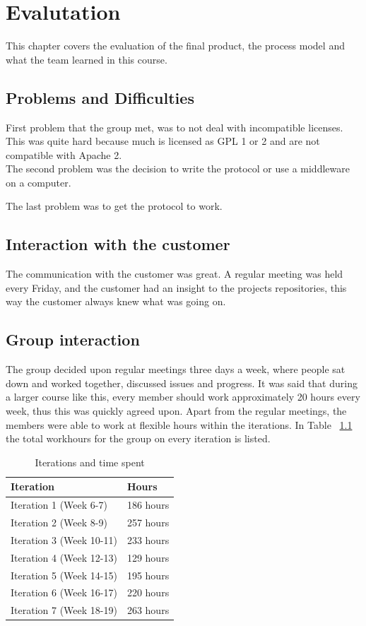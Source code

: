 \chapter{Evalutation}

This chapter covers the evaluation of the final product, the process model and what the team learned in this course.

\section{Problems and Difficulties}

	First problem that the group met, was to not deal with incompatible licenses. This was quite hard because much is licensed as GPL 1 or 2 and are not compatible with Apache 2. \\

	The second problem was the decision to write the protocol or use a middleware on a computer.

	The last problem was to get the protocol to work.

\section{Interaction with the customer}
	The communication with the customer was great. A regular meeting was held every Friday, and the customer had an insight to the projects repositories, this way the customer always knew what was going on. 


\section{Group interaction}
	The group decided upon regular meetings three days a week, where people sat down and worked together, discussed issues and progress. It was said that during a larger course like this, every member should work approximately 20 hours every week, thus this was quickly agreed upon. Apart from the regular meetings, the members were able to work at flexible hours within the iterations.
	In Table ~\ref{table:workhours} the total workhours for the group on every iteration is listed.

	\begin{table}[H]
	\caption{Iterations and time spent}
	\centering
	\label{table:workhours}
	\begin{tabular}{|l|l|}
		\hline
			{\bf Iteration} & {\bf Hours}\\
		\hline
			Iteration 1 (Week 6-7) & 186 hours\\
		\hline
			Iteration 2 (Week 8-9) & 257 hours\\
		\hline
			Iteration 3 (Week 10-11) & 233 hours\\
		\hline
			Iteration 4 (Week 12-13) & 129 hours\\
		\hline
			Iteration 5 (Week 14-15) & 195 hours\\
		\hline
			Iteration 6 (Week 16-17) & 220 hours\\
		\hline
			Iteration 7 (Week 18-19) & 263 hours\\
		\hline
	\end{tabular}
	\end{table}

